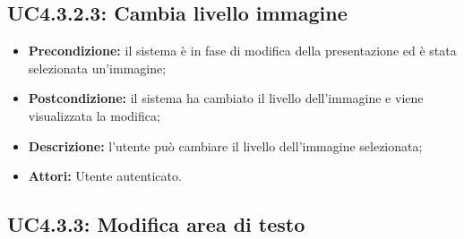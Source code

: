\subsection{ UC4.3.2.3: Cambia livello immagine}

\begin{itemize}
	\item \textbf{Precondizione:} il sistema è in fase di modifica della presentazione ed è stata selezionata un'immagine;
	\item \textbf{Postcondizione:} il sistema ha cambiato il livello dell'immagine e viene visualizzata la modifica;
	\item \textbf{Descrizione:} l'utente può cambiare il livello dell'immagine selezionata;
	\item \textbf{Attori:} Utente autenticato.
\end{itemize}
\subsection{ UC4.3.3: Modifica area di testo}


